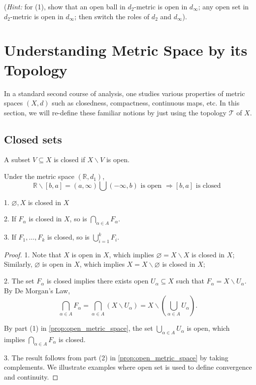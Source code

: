 ({\it Hint:} for (1), show that an open ball in \({d}_{2}\)-metric is open in \({d}_{\infty }\); any open set in \({d}_{2}\)-metric is open in \({d}_{\infty }\); then switch the roles of \({d}_{2}\) and \({d}_{\infty }\)).


\section{Understanding Metric Space by its Topology}
In a standard second course of analysis, one studies various properties of metric spaces $(X,d)$ such as closedness, compactness, continuous maps, etc. In this section, we will re-define these familiar notions by just using the topology $\mathcal{T}$ of $X$.

\subsection{Closed sets}
\begin{definition}[Closed] A subset \(V \subseteq  X\) is closed if \(X \smallsetminus  V\) is open.
\end{definition}

\begin{example} Under the metric space \(\left( {\mathbb{R},{d}_{1}}\right)\),
\[
\mathbb{R} \smallsetminus  \left\lbrack  {b,a}\right\rbrack   = \left( {a,\infty }\right) \bigcup \left( {-\infty,b}\right) \text{ is open } \Rightarrow  \left\lbrack  {b,a}\right\rbrack  \text{ is closed }
\]

1. \(\varnothing,X\) is closed in \(X\)

2. If \({F}_{\alpha }\) is closed in \(X\), so is \(\mathop{\bigcap }\limits_{{\alpha  \in  A}}{F}_{\alpha }\).

3. If \({F}_{1},\ldots,{F}_{k}\) is closed, so is \(\mathop{\bigcup }\limits_{{i = 1}}^{k}{F}_{i}\).
\end{example}

\begin{proof} 1. Note that \(X\) is open in \(X\), which implies \(\varnothing  = X \smallsetminus  X\) is closed in \(X\); Similarly, \(\varnothing\) is open in \(X\), which implies \(X = X \smallsetminus  \varnothing\) is closed in \(X\);

2. The set \({F}_{\alpha }\) is closed implies there exists open \({U}_{\alpha } \subseteq  X\) such that \({F}_{\alpha } = X \smallsetminus  {U}_{\alpha }\). By De Morgan's Law,
\[
\mathop{\bigcap }\limits_{{\alpha  \in  A}}{F}_{\alpha } = \mathop{\bigcap }\limits_{{\alpha  \in  A}}\left( {X \smallsetminus  {U}_{\alpha }}\right)  = X \smallsetminus  \left( {\mathop{\bigcup }\limits_{{\alpha  \in  A}}{U}_{\alpha }}\right).
\]

By part (1) in \autoref{prop:open_metric_space}, the set \(\mathop{\bigcup }\limits_{{\alpha  \in  A}}{U}_{\alpha }\) is open, which implies \(\mathop{\bigcap }\limits_{{\alpha  \in  A}}{F}_{\alpha }\) is closed.

3. The result follows from part (2) in \autoref{prop:open_metric_space} by taking complements. We illustrate examples where open set is used to define convergence and continuity.
\end{proof}

